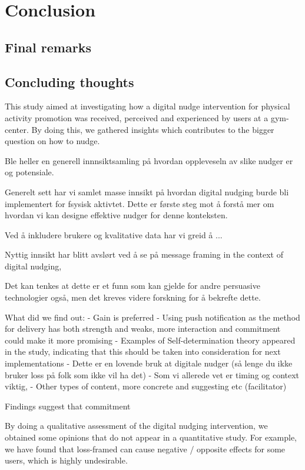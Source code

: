 \chapter{Conclusion} 

\section{Final remarks}

\section{Concluding thoughts}
This study aimed at investigating how a digital nudge intervention for physical activity promotion was received, perceived and experienced by users at a gym-center. By doing this, we gathered insights which contributes to the bigger question on how to nudge.

Ble heller en generell innnsiktsamling på hvordan oppleveseln av slike nudger er og potensiale. 

Generelt sett har vi samlet masse innsikt på hvordan digital nudging burde bli implementert for fsysisk aktivtet. Dette er første steg mot å forstå mer om hvordan vi kan designe effektive nudger for denne konteksten. 

Ved å inkludere brukere og kvalitative data har vi greid å ... 

Nyttig innsikt har blitt avslørt ved å se på message framing in the context of digital nudging, 

Det kan tenkes at dette er et funn som kan gjelde for andre persuasive technologier også, men det kreves videre forskning for å bekrefte dette. 

What did we find out:
- Gain is preferred 
- Using push notification as the method for delivery has both strength and weaks, more interaction and commitment could make it more promising
- Examples of Self-determination theory appeared in the study, indicating that this should be taken into consideration for next implementations
- Dette er en lovende bruk at digitale nudger (så lenge du ikke bruker loss på folk som ikke vil ha det)
- Som vi allerede vet er timing og context viktig, 
- Other types of content, more concrete and suggesting etc (facilitator)

Findings suggest that commitment 

By doing a qualitative assessment of the digital nudging intervention, we obtained some opinions that do not appear in a quantitative study. For example, we have found that loss-framed can cause negative / opposite effects for some users, which is highly undesirable. 

